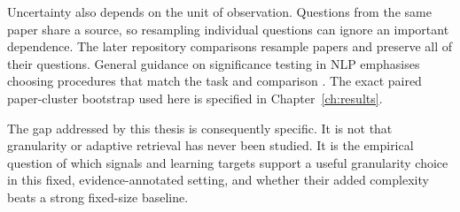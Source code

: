 Uncertainty also depends on the unit of observation. Questions from the
same paper share a source, so resampling individual questions can ignore
an important dependence. The later repository comparisons resample
papers and preserve all of their questions. General guidance on
significance testing in NLP emphasises choosing procedures that match
the task and comparison \cite{dror2018testing}. The exact paired
paper-cluster bootstrap used here is specified in
Chapter~\ref{ch:results}.

The gap addressed by this thesis is consequently specific. It is not
that granularity or adaptive retrieval has never been studied. It is
the empirical question of which signals and learning targets support
a useful granularity choice in this fixed, evidence-annotated setting,
and whether their added complexity beats a strong fixed-size baseline.
